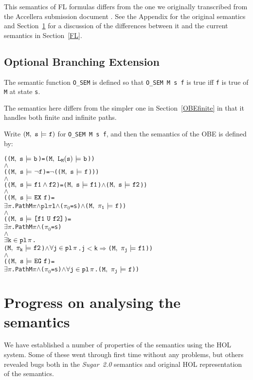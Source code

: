 \documentclass{llncs}
\newcommand{\And}{\(\wedge\)}
\newcommand{\Imp}{\(\Rightarrow\)}
\newcommand{\Not}{\(\neg\)}
\newcommand{\Exists}{\(\exists\)}
\newcommand{\Le}{\(<\)}
\renewcommand{\Pi}{\(\pi\)}
\newcommand{\BSem}[3]{(\(\tt#1,~#2~{\models}~#3\))}
\newcommand{\OSem}[3]{(\(\tt{#1,~#2~{\models}~#3}\))}
\newcommand{\Osem}{\texttt{O\_SEM}\xspace}
\newcommand{\oSem}[3]{(\tt{#1,~#2~{\models}~#3})}
\newcommand{\Pl}{\(\texttt{pl}\xspace\)}
\newcommand{\pl}{\texttt{pl}\xspace}
\newcommand{\ResExists}[2]{\(\exists{\tt#1}\in\pl\hspace*{0.5mm}#2\)}
\newcommand{\ResForall}[2]{\(\forall{\tt#1}\in\pl\hspace*{0.5mm}#2\)}
\newcommand{\pathEl}[2]{#1_{#2}}
\newcommand{\PathEl}[2]{\(#1_{#2}\)}
\newcommand{\lNoHat}[1]{{\texttt{L}}_{#1}}
\newcommand{\oBool}[1]{#1}
\newcommand{\oNot}[1]{\neg#1}
\newcommand{\oAnd}[2]{#1\wedge#2}
\newcommand{\oEx}[1]{{\texttt{EX}}~#1}
\newcommand{\oEg}[1]{{\texttt{EG}}~#1}
\newcommand{\oEu}[2]{\texttt{[}#1~{\texttt{U}}~#2\texttt{]}}
\newcommand\Sugar{{\it{Sugar~2.0}}\xspace}
\newcommand\Hol{HOL\xspace}
\newcommand\HOL{\Hol}
\begin{document}
This semantics of FL formulas differs from the one we originally transcribed from the Accellera submission document
\cite{Accellera}.
See the Appendix for the original semantics and Section~\ref{progress} for a discussion of the differences
between it and the current semantics in Section~\ref{FL}.



\subsection{Optional Branching Extension}\label{OBE}


The semantic function \Osem is defined so that
\texttt{\Osem~M~s~f} is true iff \texttt{f} is true of \texttt{M} at
state \texttt{s}.

The semantics here differs from the simpler one in Section~\ref{OBEfinite}
in that it handles both finite and infinite paths.

Write $\oSem{M}{s}{f}$ for \texttt{\Osem~M~s~f}, and then the semantics of the OBE is defined by:

{\begin{alltt}
   (\OSem{M}{s}{\oBool{b}} = {\BSem{M}{\lNoHat{M}(s)}{b}})
   {\And}
   (\OSem{M}{s}{\oNot{f}} = {\Not}(\OSem{M}{s}{f})) 
   {\And}
   (\OSem{M}{s}{\oAnd{f1}{f2}} = \OSem{M}{s}{f1} {\And} \OSem{M}{s}{f2})
   {\And}
   (\OSem{M}{s}{\oEx{f}} = 
     {\Exists}{\Pi}. Path M {\Pi} {\And} \Pl \Pi 1 {\And} (\PathEl{{\pi}}{0} = s) {\And} \OSem{M}{\pathEl{{\pi}}{1}}{f})
   {\And}
   (\OSem{M}{s}{\oEu{f1}{f2}} = 
     {\Exists}{\Pi}. Path M {\Pi} {\And} (\PathEl{{\pi}}{0} = s)
         {\And} 
         {\ResExists{k}{\pi}}. 
           \OSem{M}{\pathEl{{\pi}}{k}}{f2} {\And} {\ResForall{j}{\pi}}. j {\Le} k {\Imp} \OSem{M}{\pathEl{{\pi}}{j}}{f1})
   {\And}
   (\OSem{M}{s}{\oEg{f}} = 
     {\Exists}{\Pi}. Path M {\Pi} {\And} (\PathEl{{\pi}}{0} = s) {\And} {\ResForall{j}{\pi}}. \OSem{M}{\pathEl{{\pi}}{j}}{f})
\end{alltt}}

\section{Progress on analysing the semantics}\label{progress}

We have established a number of properties of the semantics using the \HOL system.
Some of these went through first time without any problems,
but others revealed bugs both in the \Sugar semantics and  original HOL representation
of the semantics.
\end{document}
